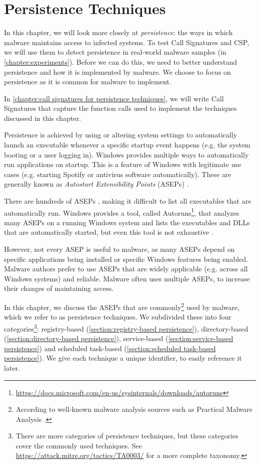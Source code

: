 \chapter{Persistence Techniques}\label{chapter:persistence techniques}
In this chapter, we will look more closely at \emph{persistence}: the ways in which malware maintains access to infected systems. To test Call Signatures and CSP, we will use them to detect persistence in real-world malware samples (in \autoref{chapter:experiments}). Before we can do this, we need to better understand persistence and how it is implemented by malware. We choose to focus on persistence as it is common for malware to implement.

In \autoref{chapter:call signatures for persistence techniques}, we will write Call Signatures that capture the function calls used to implement the techniques discussed in this chapter.

\medskip

Persistence is achieved by using or altering system settings to automatically launch an executable whenever a specific startup event happens (e.g. the system booting or a user logging in). Windows provides multiple ways to automatically run applications on startup. This is a feature of Windows with legitimate use cases (e.g. starting Spotify or antivirus software automatically). These are generally known as \emph{Autostart Extensibility Points} (ASEPs) \cite{asep-charactericstics-detectabilitiy}.

There are hundreds of ASEPs \cite{evading-autoruns}, making it difficult to list all executables that are automatically run. Windows provides a tool, called Autoruns\footnote{\tiny \url{https://docs.microsoft.com/en-us/sysinternals/downloads/autoruns}}, that analyzes many ASEPs on a running Windows system and lists the executables and DLLs that are automatically started, but even this tool is not exhaustive \cite{evading-autoruns}.

However, not every ASEP is useful to malware, as many ASEPs depend on specific applications being installed or specific Windows features being enabled. Malware authors prefer to use ASEPs that are widely applicable (e.g. across all Windows systems) and reliable. Malware often uses multiple ASEPs, to increase their changes of maintaining access.

\medskip

In this chapter, we discuss the ASEPs that are commonly\footnote{According to well-known malware analysis sources such as Practical Malware Analysis \cite{practical-malware-analysis}.} used by malware, which we refer to as persistence techniques. We subdivided these into four categories\footnote{There are more categories of persistence techniques, but these categories cover the commonly used techniques. See {\tiny \url{https://attack.mitre.org/tactics/TA0003/}} for a more complete taxonomy.}: registry-based (\autoref{section:registry-based persistence}), directory-based (\autoref{section:directory-based persistence}), service-based (\autoref{section:service-based persistence}) and scheduled task-based (\autoref{section:scheduled task-based persistence}). We give each technique a unique identifier, to easily reference it later.

